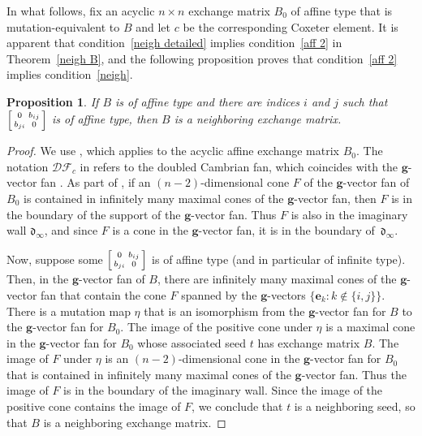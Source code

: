 \documentclass{amsart}
\newtheorem{proposition}{Proposition}[section]
\theoremstyle{definition}
\theoremstyle{remark}
\numberwithin{equation}{section}
\newcommand{\set}[1]{{\lbrace #1 \rbrace}}
\newcommand{\0}{{\mathbf{0}}}
\newcommand{\g}{\mathbf{g}}
\renewcommand{\b}{\mathbf{b}}
\newcommand{\e}{\mathbf{e}}
\renewcommand{\d}{{\mathfrak d}}
\newcommand{\DF}{{\mathcal {DF}}}
\begin{document}
In what follows, fix an acyclic $n\times n$ exchange matrix $B_0$ of affine type that is mutation-equivalent to $B$ and let $c$ be the corresponding Coxeter element.
It is apparent that condition~\ref{neigh detailed} implies condition~\ref{aff 2} in Theorem~\ref{neigh B}, and the following proposition proves that condition~\ref{aff 2} implies condition~\ref{neigh}.
\begin{proposition}\label{aff 2 block}
If $B$ is of affine type and there are indices $i$ and $j$ such that $\begin{bsmallmatrix}0&b_{ij}\\b_{ji}&0\end{bsmallmatrix}$ is of affine type, then $B$ is a neighboring exchange matrix.
\end{proposition}

\begin{proof}
We use \cite[Corollary~4.18]{afframe}, which applies to the acyclic affine exchange matrix $B_0$.
The notation $\DF_c$ in \cite{afframe} refers to the doubled Cambrian fan, which coincides with the $\g$-vector fan \cite[Corollary~1.3]{afframe}.
As part of \cite[Corollary~4.18]{afframe}, if an $(n-2)$-dimensional cone $F$ of the $\g$-vector fan of $B_0$ is contained in infinitely many maximal cones of the $\g$-vector fan, then $F$ is in the boundary of the support of the $\g$-vector fan.
Thus $F$ is also in the imaginary wall $\d_\infty$, and since $F$ is a cone in the $\g$-vector fan, it is in the boundary of~$\d_\infty$.

Now, suppose some $\begin{bsmallmatrix}0&b_{ij}\\b_{ji}&0\end{bsmallmatrix}$ is of affine type (and in particular of infinite type).
Then, in the $\g$-vector fan of $B$, there are infinitely many maximal cones of the $\g$-vector fan that contain the cone $F$ spanned by the $\g$-vectors $\set{\e_k:k\not\in\set{i,j}}$.
There is a mutation map $\eta$ that is an isomorphism from the $\g$-vector fan for $B$ to the $\g$-vector fan for $B_0$.
The image of the positive cone under $\eta$ is a maximal cone in the $\g$-vector fan for $B_0$ whose associated seed $t$ has exchange matrix $B$.
The image of $F$ under $\eta$ is an $(n-2)$-dimensional cone in the $\g$-vector fan for $B_0$ that is contained in infinitely many maximal cones of the $\g$-vector fan.
Thus the image of $F$ is in the boundary of the imaginary wall.
Since the image of the positive cone contains the image of $F$, we conclude that $t$ is a neighboring seed, so that $B$ is a neighboring exchange matrix.
\end{proof}
\end{document}
